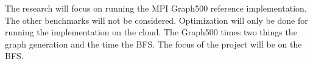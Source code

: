 The research will focus on running the MPI Graph500 reference implementation. The other benchmarks will not be considered. Optimization will only be done for running the implementation on the cloud.
The Graph500 times two things the graph generation and the time the BFS. The focus of the project will be on the BFS.